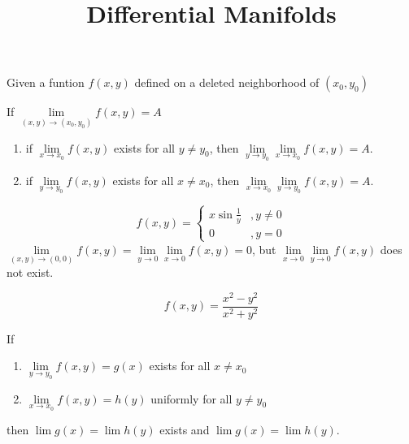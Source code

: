 \documentclass[12pt, oneside]{book}
\begin{document}
\frontmatter
\title{{\Huge{\textbf{Differential Manifolds}}}}
\maketitle
{}
\tableofcontents
\mainmatter

\chapter{}
\section{}
Given a funtion $f(x,y)$ defined on a deleted neighborhood of $(x_0,y_0)$
\begin{proposition}
    If $\lim\limits_{(x,y)\to (x_0,y_0)} f(x,y) = A$
    \begin{enumerate}
        \item 
        if $\lim\limits_{x\to x_0} f(x,y) $ exists for all $y\neq y_0$, then $\lim\limits_{y\to y_0}\lim\limits_{x\to x_0} f(x,y) = A$.
        \item 
        if $\lim\limits_{y\to y_0} f(x,y) $ exists for all $x\neq x_0$, then $\lim\limits_{x\to x_0}\lim\limits_{y\to y_0} f(x,y) = A$.
    \end{enumerate}
\end{proposition}

\begin{example}
    \begin{equation*}
        f(x,y)=
        \begin{cases}
            x\sin \frac{1}{y}& ,y\neq 0\\  
            0& ,y=0
        \end{cases}
    \end{equation*}
    $\lim\limits_{(x,y)\to (0,0)} f(x,y) =\lim\limits_{y\to 0}\lim\limits_{x\to 0} f(x,y)=0 $, but $\lim\limits_{x\to 0}\lim\limits_{y\to 0} f(x,y)$ does not exist.
\end{example}
\begin{example}
    \begin{equation*}
        f(x,y)=\frac{x^2-y^2}{x^2+y^2}
    \end{equation*}
\end{example}


\begin{proposition}
    If
    \begin{enumerate}[label=(\roman*)]
        \item $\lim\limits_{y\to y_0} f(x,y) =g(x)$ exists for all $x\neq x_0$ 
        \item $\lim\limits_{x\to x_0} f(x,y)=h(y) $  uniformly for all $y\neq y_0$
    \end{enumerate}
    then $\lim g(x)=\lim h(y)$ exists and $ \lim g(x)=\lim h(y)$.
\end{proposition}
\end{document}
